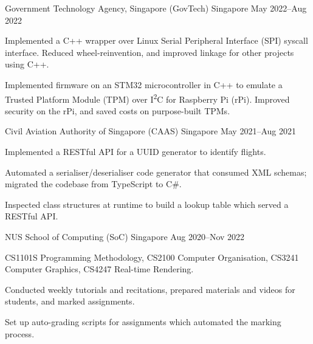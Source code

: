 \begin{cventries}
	{Government Technology Agency, Singapore (GovTech)} %
	{Singapore} %
	{May 2022--Aug 2022} %
	{
		\begin{cvitems} %
			\item Implemented a C++ wrapper over Linux Serial Peripheral Interface (SPI) syscall interface. Reduced wheel-reinvention, and improved linkage for other projects using C++.
			\item Implemented firmware on an STM32 microcontroller in C++ to emulate a Trusted Platform Module (TPM) over I\textsuperscript{2}C for Raspberry Pi (rPi). Improved security on the rPi, and saved costs on purpose-built TPMs.
		\end{cvitems}
	}


	{Civil Aviation Authority of Singapore (CAAS)} %
	{Singapore} %
	{May 2021--Aug 2021} %
	{
		\begin{cvitems} %
			\item Implemented a RESTful API for a UUID generator to identify flights.
			\item Automated a serialiser/deserialiser code generator that consumed XML schemas; migrated the codebase from TypeScript to C\#.
			\item Inspected class structures at runtime to build a lookup table which served a RESTful API.
		\end{cvitems}
	}


	{NUS School of Computing (SoC)} %
	{Singapore} %
	{Aug 2020--Nov 2022} %
	{
		\begin{cvitems} %
			\item CS1101S Programming Methodology, CS2100 Computer Organisation, CS3241 Computer Graphics, CS4247 Real-time Rendering.
			\item Conducted weekly tutorials and recitations, prepared materials and videos for students, and marked assignments.
			\item Set up auto-grading scripts for assignments which automated the marking process.
		\end{cvitems}
	}


\end{cventries}
